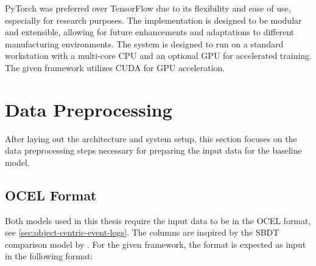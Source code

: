 PyTorch was preferred over TensorFlow due to its flexibility and ease of use, especially for research purposes. The implementation is designed to be modular and extensible, allowing for future enhancements and adaptations to different manufacturing environments.
The system is designed to run on a standard workstation with a multi-core CPU and an optional GPU for accelerated training. The given framework utilizes CUDA \autocite{NVIDIA_CUDA} for GPU acceleration.

\section*{Data Preprocessing}
\label{sec:event_log_processing}

After laying out the architecture and system setup, this section focuses on the data preprocessing steps necessary for preparing the input data for the baseline model.

\subsection{OCEL Format}

Both models used in this thesis require the input data to be in the OCEL format, see \autoref{sec:object-centric-event-logs}. The columns are inspired by the SBDT comparison model by \textcite{schwede2024learning}. For the given framework, the format is expected as input in the following format:

